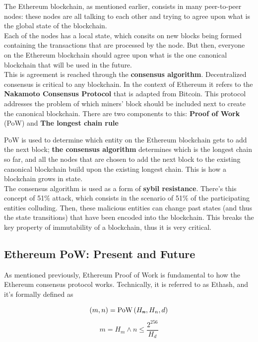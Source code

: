 The Ethereum blockchain, as mentioned earlier, consists in many peer-to-peer nodes: these nodes are all talking to each other and trying to agree upon what is the global state of the blockchain.\\

Each of the nodes has a local state, which consits on new blocks being formed containing the transactions that are processed by the node.
But then, everyone on the Ethereum blockchain should agree upon what is the one canonical blockchain that will be used in the future.\\

This is agreement is reached through the \textbf{consensus algorithm}.
Decentralized consensus is critical to any blockchain. In the context of Ethereum it refers to the \textbf{Nakamoto Consensus Protocol} that is adapted from Bitcoin. This protocol addresses the problem of which miners' block should be included next to create the canonical blockchain. There are two components to this: \textbf{Proof of Work} (PoW) and \textbf{The longest chain rule}

PoW is used to determine which entity on the Ethereum blockchain gets to add the next block; \textbf{the consensus algorithm} determines which is the longest chain so far, and all the nodes that are chosen to add the next block to the existing canonical blockchain build upon the existing longest chain.
This is how a blockchain grows in state.\\

The consensus algorithm is used as a form of \textbf{sybil resistance}.
There's this concept of 51\% attack, which consists in the scenario of 51\% of the participating entities colluding.
Then, these malicious entities can change past states (and thus the state transitions) that have been encoded into the blockchain.
This breaks the key property of immutability of a blockchain, thus it is very critical.\\

\subsection*{Ethereum PoW: Present and Future}\label{subsection:EthereumPow}

As mentioned previously, Ethereum Proof of Work is fundamental to how the Ethereum consensus protocol works.
Technically, it is referred to as Ethash, and it's formally defined as

$$(m,n)=\text{PoW}\left(H_\text{\sout{$n$}},H_n,d\right)$$
$$m=H_m\wedge n\leq\frac{2^{256}}{H_d}$$

